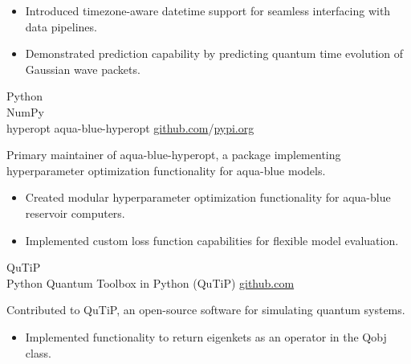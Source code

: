 \documentclass[9pt]{developercv} %
\begin{document}
\begin{entrylist}
{\begin{itemize}[noitemsep,topsep=0pt,parsep=0pt,partopsep=0pt, leftmargin=7pt]
		\item Introduced timezone-aware datetime support for seamless interfacing with data pipelines.
		\item Demonstrated prediction capability by predicting quantum time evolution of Gaussian wave packets. 
		\end{itemize}
		}
	\entry
		{Python \\ NumPy \\ hyperopt}
		{aqua-blue-hyperopt}
		{\href{https://github.com/lonelyneutrin0/aqua-blue-hyperopt}{github.com}/\href{https://pypi.org/project/aqua-blue-hyperopt/}{pypi.org}}
		{Primary maintainer of aqua-blue-hyperopt, a package implementing hyperparameter optimization functionality for aqua-blue models.
		\begin{itemize}[noitemsep,topsep=0pt,parsep=0pt,partopsep=0pt, leftmargin=7pt]
		\item Created modular hyperparameter optimization functionality for aqua-blue reservoir computers.
		\item Implemented custom loss function capabilities for flexible model evaluation.
        \end{itemize}
		}
\end{entrylist}
\begin{entrylist}
	\entry
		{QuTiP \\ Python}
		{Quantum Toolbox in Python (QuTiP)}
		{\href{https://github.com/qutip/qutip}{github.com}}
		{Contributed to QuTiP, an open-source software for simulating quantum systems.
		\begin{itemize}[noitemsep,topsep=0pt,parsep=0pt,partopsep=0pt, leftmargin=7pt]
		\item Implemented functionality to return eigenkets as an operator in the Qobj class.
		\end{itemize}
		}
\end{entrylist}
\end{document}
